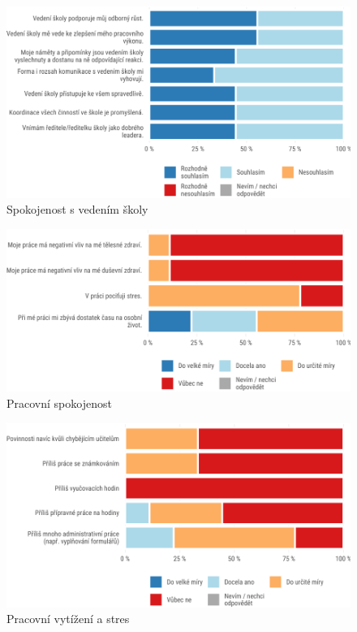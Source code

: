 \documentclass[12pt,a4paper,]{report}
\begin{document}
\begin{figure}

{\centering \includegraphics[width=\textwidth]{figs/tots4q3leaderappdx-1}

}

\caption{Spokojenost s vedením školy}\label{fig:tots4q3leaderappdx}
\end{figure}

\begin{figure}

{\centering \includegraphics[width=\textwidth]{figs/tots6q1T3WELSappdx-1}

}

\caption{Pracovní spokojenost}\label{fig:tots6q1T3WELSappdx}
\end{figure}

\begin{figure}

{\centering \includegraphics[width=\textwidth]{figs/tots6q2T3WLOADappdx-1}

}

\caption{Pracovní vytížení a stres}\label{fig:tots6q2T3WLOADappdx}
\end{figure}
\end{document}

